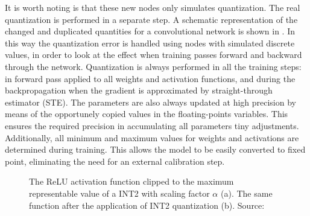 It is worth noting is that these new nodes only simulates quantization. The real quantization is performed in a separate step. A schematic representation of the changed and duplicated quantities for a convolutional network is shown in \Figure{\ref{fig:qnn_neuron}}.
In this way the quantization error is handled using nodes with simulated discrete values, in order to look at the effect when training passes forward and backward through the network. Quantization is always performed in all the training steps: in forward pass applied to all weights and activation functions, and during the backpropagation when the gradient is approximated by straight-through estimator (STE). The parameters are also always updated at high precision by means of the opportunely copied values in the floating-points variables. This ensures the required precision in accumulating all parameters tiny adjustments.
Additionally, all minimum and maximum values for weights and activations are determined during training. This allows the model to be easily converted to fixed point, eliminating the need for an external calibration step.

\begin{figure}
    \centering
    \caption{ The ReLU activation function clipped to the maximum representable value of a INT2 with scaling factor $\alpha$ (a). The same function after the application of INT2 quantization (b).
    Source:~\cite{yin2019understanding} }
    \label{fig:qrelu}
\end{figure}


